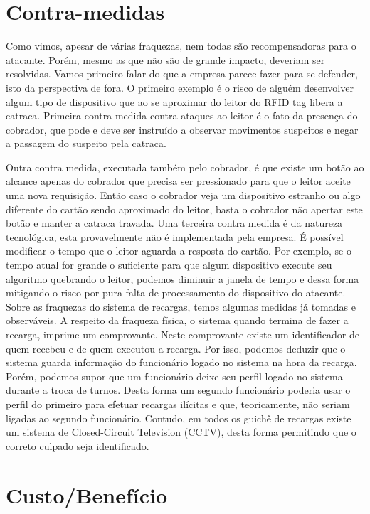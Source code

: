 \documentclass[openany]{ufsctex/ufsctex}
\begin{document}
   \chapter{Contra-medidas}
Como vimos, apesar de várias fraquezas, nem todas são recompensadoras para o atacante. Porém, mesmo as que não são de grande impacto, deveriam ser resolvidas. Vamos primeiro falar do que a empresa parece fazer para se defender, isto da perspectiva de fora. O primeiro exemplo é o risco de alguém desenvolver algum tipo de dispositivo que ao se aproximar do leitor do RFID tag libera a catraca. Primeira contra medida contra ataques ao leitor é o fato da presença do cobrador, que pode e deve ser instruído a observar movimentos suspeitos e negar a passagem do suspeito pela catraca. 


Outra contra medida, executada também pelo cobrador, é que existe um botão ao alcance apenas do cobrador que precisa ser pressionado para que o leitor aceite uma nova requisição. Então caso o cobrador veja um dispositivo estranho ou algo diferente do cartão sendo aproximado do leitor, basta o cobrador não apertar este botão e manter a catraca travada. Uma terceira contra medida é da natureza tecnológica,  esta provavelmente não é implementada pela empresa. É possível modificar o tempo que o leitor aguarda a resposta do cartão. Por exemplo, se o tempo atual for grande o suficiente para que algum dispositivo execute seu algoritmo quebrando o leitor, podemos diminuir a janela de tempo e dessa forma mitigando o risco por pura falta de processamento do dispositivo do atacante.
Sobre as fraquezas do sistema de recargas, temos algumas medidas já tomadas e observáveis. A respeito da fraqueza física, o sistema quando termina de fazer a recarga, imprime um comprovante. Neste comprovante existe um identificador de quem recebeu e de quem executou a recarga. Por isso, podemos deduzir que o sistema guarda informação do funcionário logado no sistema na hora da recarga. Porém, podemos supor que um funcionário deixe seu perfil logado no sistema durante a troca de turnos. Desta forma um segundo funcionário poderia usar o perfil do primeiro para efetuar recargas ilícitas e que, teoricamente, não seriam ligadas ao segundo funcionário. Contudo, em todos os guichê de recargas existe um sistema de Closed-Circuit Television (CCTV), desta forma permitindo que o correto culpado seja identificado.

   \chapter{Custo/Benefício}
\end{document}

